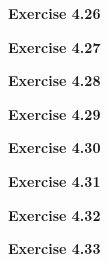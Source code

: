 \documentclass{article}
\begin{document}
\bigskip

\begin{framed}
    \noindent \textbf{Exercise 4.26}
    
    \medskip
    
    
\end{framed}


\bigskip

\begin{framed}
    \noindent \textbf{Exercise 4.27}
    
    \medskip
    
    
\end{framed}


\bigskip

\begin{framed}
    \noindent \textbf{Exercise 4.28}
    
    \medskip
    
    
\end{framed}


\bigskip

\begin{framed}
    \noindent \textbf{Exercise 4.29}
    
    \medskip
    
    
\end{framed}


\bigskip

\begin{framed}
    \noindent \textbf{Exercise 4.30}
    
    \medskip
    
    
\end{framed}


\bigskip

\begin{framed}
    \noindent \textbf{Exercise 4.31}
    
    \medskip
    
    
\end{framed}


\bigskip

\begin{framed}
    \noindent \textbf{Exercise 4.32}
    
    \medskip
    
    
\end{framed}


\bigskip

\begin{framed}
    \noindent \textbf{Exercise 4.33}
    
    \medskip
    
    
\end{framed}
\end{document}
